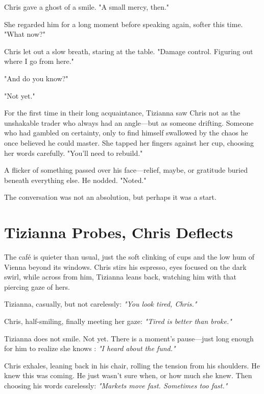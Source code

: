 Chris gave a ghost of a smile. "A small mercy, then."

She regarded him for a long moment before speaking again, softer this time. "What now?"

Chris let out a slow breath, staring at the table. "Damage control. Figuring out where I go from here."

"And do you know?"

"Not yet."

For the first time in their long acquaintance, Tizianna saw Chris not as the unshakable trader who always had an angle—but as someone drifting. Someone who had gambled on certainty, only to find himself swallowed by the chaos he once believed he could master. She tapped her fingers against her cup, choosing her words carefully. "You’ll need to rebuild."

A flicker of something passed over his face—relief, maybe, or gratitude buried beneath everything else. He nodded. "Noted."

The conversation was not an absolution, but perhaps it was a start.

\newpage

\section*{Tizianna Probes, Chris Deflects}

The café is quieter than usual, just the soft clinking of cups and the low hum of Vienna beyond its windows. Chris stirs his espresso, eyes focused on the dark swirl, while across from him, Tizianna leans back, watching him with that piercing gaze of hers.

{Tizianna}, casually, but not carelessly: \textit{"You look tired, Chris."}

{Chris}, half-smiling, finally meeting her gaze: \textit{"Tired is better than broke."}

\smallskip

Tizianna does not smile. Not yet. There is a moment’s pause—just long enough for him to realize she knows : \textit{"I heard about the fund."}

\smallskip

Chris exhales, leaning back in his chair, rolling the tension from his shoulders. He knew this was coming. He just wasn’t sure when, or how much she knew. Then choosing his words carelessly: \textit{"Markets move fast. Sometimes too fast."}

\smallskip

